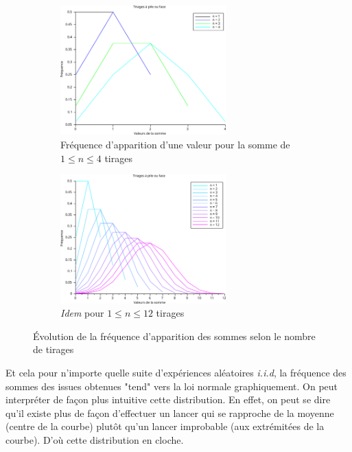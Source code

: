 \begin{figure}[h]
    \centering
    \begin{subfigure}[b]{0.45\textwidth}
        \centering
        \includegraphics[width=0.7\textwidth]{images/courbe_tirages.png}
        \caption{Fréquence d'apparition d'une valeur pour la somme de $1 \leqslant n \leqslant 4$ tirages}
    \end{subfigure}
    \hfill
    \begin{subfigure}[b]{0.45\textwidth}
        \centering
        \includegraphics[width=0.7\textwidth]{images/courbe_tirages_12.png}
        \caption{\emph{Idem} pour $1 \leqslant n \leqslant 12$ tirages}
    \end{subfigure}
    \caption{Évolution de la fréquence d'apparition des sommes selon le nombre de tirages}
\end{figure}

Et cela pour n'importe quelle suite d'expériences aléatoires \emph{i.i.d}, la fréquence des sommes des issues obtenues 
"tend" vers la loi normale graphiquement. On peut interpréter de façon plus intuitive cette distribution. 
En effet, on peut se dire qu'il existe plus de façon d'effectuer un lancer qui se rapproche de la moyenne (centre de la courbe)
plutôt qu'un lancer improbable (aux extrémitées de la courbe). D'où cette distribution en cloche. 

